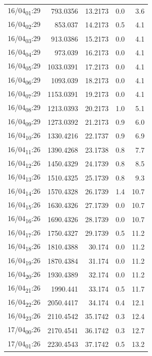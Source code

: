 \documentclass[11pt]{article}
\begin{document}
\begin{center}
\begin{tabular}{lrrrr}
16/04\textsubscript{01}:29 & 793.0356 & 13.2173 & 0.0 & 3.6\\[0pt]
16/04\textsubscript{02}:29 & 853.037 & 14.2173 & 0.5 & 4.1\\[0pt]
16/04\textsubscript{03}:29 & 913.0386 & 15.2173 & 0.0 & 4.1\\[0pt]
16/04\textsubscript{04}:29 & 973.039 & 16.2173 & 0.0 & 4.1\\[0pt]
16/04\textsubscript{05}:29 & 1033.0391 & 17.2173 & 0.0 & 4.1\\[0pt]
16/04\textsubscript{06}:29 & 1093.039 & 18.2173 & 0.0 & 4.1\\[0pt]
16/04\textsubscript{07}:29 & 1153.0391 & 19.2173 & 0.0 & 4.1\\[0pt]
16/04\textsubscript{08}:29 & 1213.0393 & 20.2173 & 1.0 & 5.1\\[0pt]
16/04\textsubscript{09}:29 & 1273.0392 & 21.2173 & 0.9 & 6.0\\[0pt]
16/04\textsubscript{10}:26 & 1330.4216 & 22.1737 & 0.9 & 6.9\\[0pt]
16/04\textsubscript{11}:26 & 1390.4268 & 23.1738 & 0.8 & 7.7\\[0pt]
16/04\textsubscript{12}:26 & 1450.4329 & 24.1739 & 0.8 & 8.5\\[0pt]
16/04\textsubscript{13}:26 & 1510.4325 & 25.1739 & 0.8 & 9.3\\[0pt]
16/04\textsubscript{14}:26 & 1570.4328 & 26.1739 & 1.4 & 10.7\\[0pt]
16/04\textsubscript{15}:26 & 1630.4326 & 27.1739 & 0.0 & 10.7\\[0pt]
16/04\textsubscript{16}:26 & 1690.4326 & 28.1739 & 0.0 & 10.7\\[0pt]
16/04\textsubscript{17}:26 & 1750.4327 & 29.1739 & 0.5 & 11.2\\[0pt]
16/04\textsubscript{18}:26 & 1810.4388 & 30.174 & 0.0 & 11.2\\[0pt]
16/04\textsubscript{19}:26 & 1870.4384 & 31.174 & 0.0 & 11.2\\[0pt]
16/04\textsubscript{20}:26 & 1930.4389 & 32.174 & 0.0 & 11.2\\[0pt]
16/04\textsubscript{21}:26 & 1990.441 & 33.174 & 0.5 & 11.7\\[0pt]
16/04\textsubscript{22}:26 & 2050.4417 & 34.174 & 0.4 & 12.1\\[0pt]
16/04\textsubscript{23}:26 & 2110.4542 & 35.1742 & 0.3 & 12.4\\[0pt]
17/04\textsubscript{00}:26 & 2170.4541 & 36.1742 & 0.3 & 12.7\\[0pt]
17/04\textsubscript{01}:26 & 2230.4543 & 37.1742 & 0.5 & 13.2\\[0pt]

\end{tabular}
\end{center}
\end{document}
